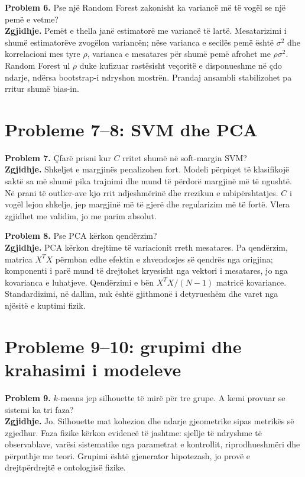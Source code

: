 \documentclass[12pt,a4paper,oneside]{book}
\begin{document}
\textbf{Problem 6.} Pse një Random Forest zakonisht ka variancë më të vogël se një pemë e vetme?\\
\textbf{Zgjidhje.} Pemët e thella janë estimatorë me variancë të lartë. Mesatarizimi i shumë estimatorëve zvogëlon variancën; nëse varianca e secilës pemë është $\sigma^2$ dhe korrelacioni mes tyre $\rho$, varianca e mesatares për shumë pemë afrohet me $\rho\sigma^2$. Random Forest ul $\rho$ duke kufizuar rastësisht veçoritë e disponueshme në çdo ndarje, ndërsa bootstrap-i ndryshon mostrën. Prandaj ansambli stabilizohet pa rritur shumë bias-in.

\section{Probleme 7--8: SVM dhe PCA}
\textbf{Problem 7.} Çfarë prisni kur $C$ rritet shumë në soft-margin SVM?\\
\textbf{Zgjidhje.} Shkeljet e margjinës penalizohen fort. Modeli përpiqet të klasifikojë saktë sa më shumë pika trajnimi dhe mund të përdorë margjinë më të ngushtë. Në prani të outlier-ave kjo rrit ndjeshmërinë dhe rrezikun e mbipërshtatjes. $C$ i vogël lejon shkelje, jep margjinë më të gjerë dhe regularizim më të fortë. Vlera zgjidhet me validim, jo me parim absolut.

\textbf{Problem 8.} Pse PCA kërkon qendërzim?\\
\textbf{Zgjidhje.} PCA kërkon drejtime të variacionit rreth mesatares. Pa qendërzim, matrica $X^TX$ përmban edhe efektin e zhvendosjes së qendrës nga origjina; komponenti i parë mund të drejtohet kryesisht nga vektori i mesatares, jo nga kovarianca e luhatjeve. Qendërzimi e bën $X^TX/(N-1)$ matricë kovariance. Standardizimi, në dallim, nuk është gjithmonë i detyrueshëm dhe varet nga njësitë e kuptimi fizik.

\section{Probleme 9--10: grupimi dhe krahasimi i modeleve}
\textbf{Problem 9.} $k$-means jep silhouette të mirë për tre grupe. A kemi provuar se sistemi ka tri faza?\\
\textbf{Zgjidhje.} Jo. Silhouette mat kohezion dhe ndarje gjeometrike sipas metrikës së zgjedhur. Faza fizike kërkon evidencë të jashtme: sjellje të ndryshme të observablave, varësi sistematike nga parametrat e kontrollit, riprodhueshmëri dhe përputhje me teori. Grupimi është gjenerator hipotezash, jo provë e drejtpërdrejtë e ontologjisë fizike.
\end{document}

